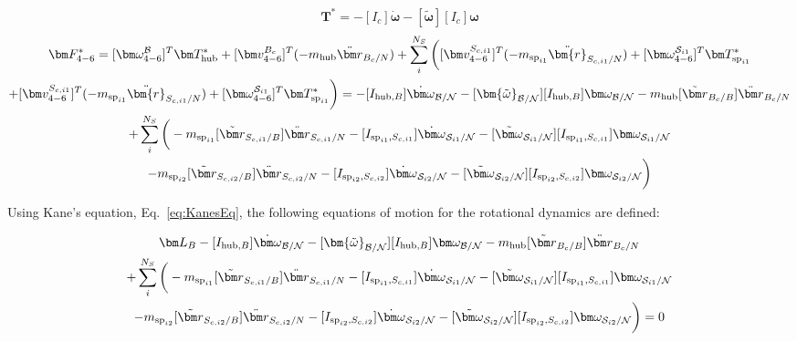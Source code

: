 \begin{equation}
	\bm T^* = -[I_c] \dot{\bm\omega}  -[\bm{\tilde{\omega}}] [I_c] \bm\omega
\end{equation}
\begin{multline}
	\bm F^*_{4-6} = [\bm \omega_{4-6}^{\cal{B}}]^T \bm T^*_{\text{hub}} + [\bm v^{B_c}_{4-6}]^T (-m_{\text{hub}} \ddot{\bm r}_{B_c/N}) + \sum\limits_{i}^{N_S}\bigg([\bm v^{S_{c,i1}}_{4-6}]^T (-m_{\text{sp}_{i1}} \ddot{\bm{r}}_{S_{c,{i1}}/N}) + [\bm \omega_{4-6}^{\mathcal{S}_{i1}}]^T \bm T^*_{\text{sp}_{i1}} \\
	+ [\bm v^{S_{c,i1}}_{4-6}]^T (-m_{\text{sp}_{i1}} \ddot{\bm{r}}_{S_{c,{i1}}/N}) + [\bm \omega_{4-6}^{\mathcal{S}_{i1}}]^T \bm T^*_{\text{sp}_{i1}}\bigg)
	= -[I_{\text{hub},B}] \dot{\bm\omega}_{\cal B/N}  -[\bm{\tilde{\omega}}_{\cal B/N}] [I_{\text{hub},B}] \bm\omega_{\cal B/N} - m_{\text{hub}} [\tilde{{\bm r}}_{B_c/B}] \ddot{\bm r}_{B_c/N} \\
	+ \sum\limits_{i}^{N_S}\bigg(- m_{\text{sp}_{i1}} [\tilde{{\bm r}}_{S_{c,i1}/B}] \ddot{\bm r}_{S_{c,i1}/N} -[I_{\text{sp}_{i1},S_{c,i1}}] \dot{\bm\omega}_{\mathcal{S}_{i1}/\mathcal{N}}  -[\tilde{\bm \omega}_{\mathcal{S}_{i1}/\mathcal{N}}] [I_{\text{sp}_{i1},S_{c,i1}}] \bm \omega_{\mathcal{S}_{i1}/\mathcal{N}}\\
	- m_{\text{sp}_{i2}} [\tilde{{\bm r}}_{S_{c,i2}/B}] \ddot{\bm r}_{S_{c,i2}/N} -[I_{\text{sp}_{i2},S_{c,i2}}] \dot{\bm\omega}_{\mathcal{S}_{i2}/\mathcal{N}}  -[\tilde{\bm \omega}_{\mathcal{S}_{i2}/\mathcal{N}}] [I_{\text{sp}_{i2},S_{c,i2}}] \bm \omega_{\mathcal{S}_{i2}/\mathcal{N}}\bigg)
\end{multline}

Using Kane's equation, Eq.~\eqref{eq:KanesEq}, the following equations of motion for the rotational dynamics are defined:

\begin{multline}
	\bm L_B -[I_{\text{hub},B}] \dot{\bm\omega}_{\cal B/N}  -[\bm{\tilde{\omega}}_{\cal B/N}] [I_{\text{hub},B}] \bm\omega_{\cal B/N} - m_{\text{hub}} [\tilde{{\bm r}}_{B_c/B}] \ddot{\bm r}_{B_c/N} \\
	+ \sum\limits_{i}^{N_S}\bigg(- m_{\text{sp}_{i1}} [\tilde{{\bm r}}_{S_{c,i1}/B}] \ddot{\bm r}_{S_{c,i1}/N} -[I_{\text{sp}_{i1},S_{c,i1}}] \dot{\bm\omega}_{\mathcal{S}_{i1}/\mathcal{N}}  -[\tilde{\bm \omega}_{\mathcal{S}_{i1}/\mathcal{N}}] [I_{\text{sp}_{i1},S_{c,i1}}] \bm \omega_{\mathcal{S}_{i1}/\mathcal{N}}\\
	- m_{\text{sp}_{i2}} [\tilde{{\bm r}}_{S_{c,i2}/B}] \ddot{\bm r}_{S_{c,i2}/N} -[I_{\text{sp}_{i2},S_{c,i2}}] \dot{\bm\omega}_{\mathcal{S}_{i2}/\mathcal{N}}  -[\tilde{\bm \omega}_{\mathcal{S}_{i2}/\mathcal{N}}] [I_{\text{sp}_{i2},S_{c,i2}}] \bm \omega_{\mathcal{S}_{i2}/\mathcal{N}}\bigg) = 0
\end{multline}


